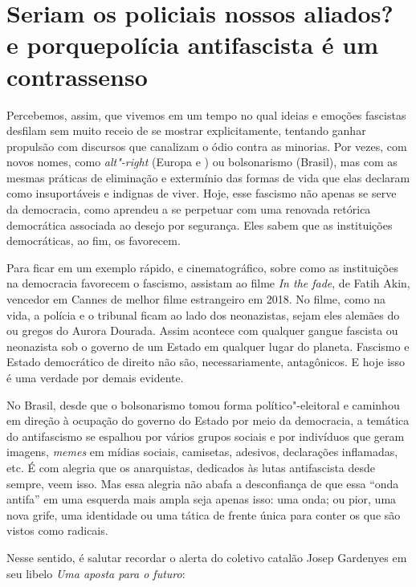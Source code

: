 \section{Seriam os policiais nossos aliados? e porque\break polícia antifascista é um contrassenso}

Percebemos, assim, que vivemos em um tempo no qual ideias e emoções fascistas desfilam sem muito receio de se mostrar explicitamente, tentando ganhar propulsão com discursos que canalizam o ódio contra as minorias. Por vezes, com novos nomes, como \emph{alt"-right} (Europa e ) ou bolsonarismo (Brasil), mas com as mesmas práticas de eliminação e extermínio das formas de vida que elas declaram como insuportáveis e indignas de viver. Hoje, esse fascismo não apenas se serve da democracia, como aprendeu a se perpetuar com uma renovada retórica democrática associada ao desejo por segurança. Eles sabem que as instituições democráticas, ao fim, os favorecem.

Para ficar em um exemplo rápido, e cinematográfico, sobre como as instituições na democracia favorecem o fascismo, assistam ao filme \emph{In the fade}, de Fatih Akin, vencedor em Cannes de melhor filme estrangeiro em 2018. No filme, como na vida, a polícia e o tribunal ficam ao lado dos neonazistas, sejam eles alemães do  ou gregos do Aurora Dourada. Assim acontece com qualquer gangue fascista ou neonazista sob o governo de um Estado em qualquer lugar do planeta. Fascismo e Estado democrático de direito não são, necessariamente, antagônicos. E hoje isso é uma verdade por demais evidente.

No Brasil, desde que o bolsonarismo tomou forma político"-eleitoral e caminhou em direção à ocupação do governo do Estado por meio da democracia, a temática do antifascismo se espalhou por vários grupos sociais e por indivíduos que geram imagens, \emph{memes} em mídias sociais, camisetas, adesivos, declarações inflamadas, etc. É com alegria que os anarquistas, dedicados às lutas antifascista desde sempre, veem isso. Mas essa alegria não abafa a desconfiança de que essa ``onda antifa'' em uma esquerda mais ampla seja apenas isso: uma onda; ou pior, uma nova grife, uma identidade ou uma tática de frente única para conter os que são vistos como radicais.

Nesse sentido, é salutar recordar o alerta do coletivo catalão Josep Gardenyes em seu libelo \emph{Uma aposta para o futuro}: 

